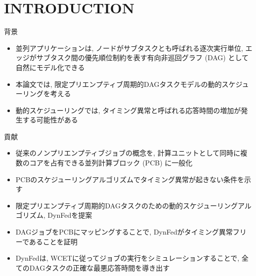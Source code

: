 
\section{INTRODUCTION}
\label{sec: introduction}

\begin{frame}{背景}
    \begin{itemize}
        \item 並列アプリケーションは, ノードがサブタスクとも呼ばれる逐次実行単位, エッジがサブタスク間の優先順位制約を表す有向非巡回グラフ (DAG) として自然にモデル化できる
        \item 本論文では, 限定プリエンプティブ周期的DAGタスクモデルの動的スケジューリングを考える
        \item 動的スケジューリングでは, タイミング異常と呼ばれる応答時間の増加が発生する可能性がある
    \end{itemize}
\end{frame}

\begin{frame}{貢献}
    \begin{itemize}
        \item 従来のノンプリエンプティブジョブの概念を, 計算ユニットとして同時に複数のコアを占有できる並列計算ブロック (PCB) に一般化
        \item PCBのスケジューリングアルゴリズムでタイミング異常が起きない条件を示す
        \item 限定プリエンプティブ周期的DAGタスクのための動的スケジューリングアルゴリズム, DynFedを提案
        \item DAGジョブをPCBにマッピングすることで, DynFedがタイミング異常フリーであることを証明
        \item DynFedは, WCETに従ってジョブの実行をシミュレーションすることで, 全てのDAGタスクの正確な最悪応答時間を導き出す
    \end{itemize}
\end{frame}
